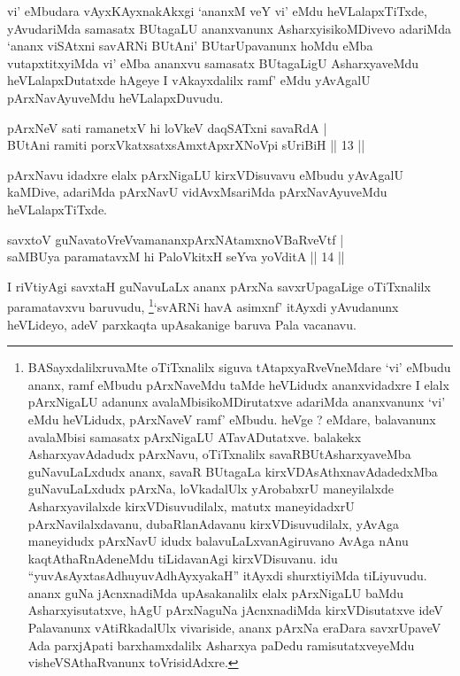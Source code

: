 \begin{artha}
vi' eMbudara vAyxKAyxnakAkxgi `ananxM veY vi' eMdu heVLalapxTiTxde, yAvudariMda samasatx BUtagaLU ananxvanunx AsharxyisikoMDivevo adariMda `ananx viSAtxni savARNi BUtAni' BUtarUpavanunx hoMdu eMba vutapxtitxyiMda vi' eMba ananxvu samasatx BUtagaLigU AsharxyaveMdu heVLalapxDutatxde hAgeye I vAkayxdalilx ramf' eMdu yAvAgalU pArxNavAyuveMdu heVLalapxDuvudu.
\end{artha}

\begin{shl}
pArxNeV sati ramanetxV hi loVkeV daqSATxni savaRdA  | \\
BUtAni ramiti porxVkatxsatxsAmxtApxrXNoV\s pi sUriBiH \hfill ||  13 || 
\end{shl}

\begin{artha}
pArxNavu idadxre elalx pArxNigaLU kirxVDisuvavu eMbudu yAvAgalU kaMDive, adariMda pArxNavU vidAvxMsariMda pArxNavAyuveMdu heVLalapxTiTxde.
\end{artha}

\begin{shl}
savxtoV guNavatoVreVvamananxpArxNAtamxnoVBaRveVtf  | \\
saMBUya paramatavxM hi PaloVkitxH seYva yoVditA \hfill ||  14 || 
\end{shl}

\begin{artha}
I riVtiyAgi savxtaH guNavuLaLx ananx pArxNa savxrUpagaLige oTiTxnalilx paramatavxvu baruvudu, \footnote{BASayxdalilxruvaMte oTiTxnalilx siguva tAtapxyaRveVneMdare \mdash  `vi' eMbudu ananx, ramf eMbudu pArxNaveMdu taMde heVLidudx ananxvidadxre I elalx pArxNigaLU adanunx avalaMbisikoMDirutatxve adariMda ananxvanunx `vi' eMdu heVLidudx, pArxNaveV ramf' eMbudu. heVge ? eMdare, balavanunx avalaMbisi samasatx pArxNigaLU ATavADutatxve. balakekx AsharxyavAdadudx pArxNavu, oTiTxnalilx savaRBUtAsharxyaveMba guNavuLaLxdudx ananx, savaR BUtagaLa kirxVDAsAthxnavAdadedxMba guNavuLaLxdudx pArxNa, loVkadalUlx yArobabxrU maneyilalxde Asharxyavilalxde kirxVDisuvudilalx, matutx maneyidadxrU pArxNavilalxdavanu, dubaRlanAdavanu kirxVDisuvudilalx, yAvAga maneyidudx pArxNavU idudx balavuLaLxvanAgiruvano AvAga nAnu kaqtAthaRnAdeneMdu tiLidavanAgi kirxVDisuvanu. idu ``yuvAsAyxtasAdhuyuvAdhAyxyakaH'' itAyxdi shurxtiyiMda tiLiyuvudu. ananx guNa jAcnxnadiMda upAsakanalilx elalx pArxNigaLU baMdu Asharxyisutatxve, hAgU pArxNaguNa jAcnxnadiMda kirxVDisutatxve ideV Palavanunx vAtiRkadalUlx vivariside, ananx pArxNa eraDara savxrUpaveV Ada parxjApati barxhamxdalilx Asharxya paDedu ramisutatxveyeMdu visheVSAthaRvanunx toVrisidAdxre.}`svARNi havA asimxnf' itAyxdi yAvudanunx heVLideyo, adeV parxkaqta upAsakanige baruva Pala vacanavu.
\end{artha}


